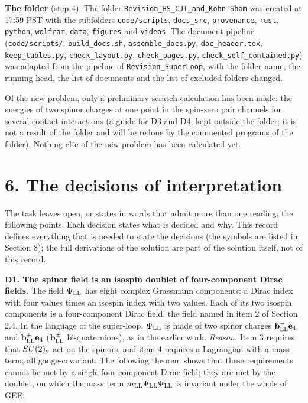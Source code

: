 \documentclass[
  10pt,
]{article}
\begin{document}
\textbf{The folder} (step 4). The folder
\texttt{Revision\_HS\_CJT\_and\_Kohn-Sham} was created at 17:59 PST with
the subfolders \texttt{code/scripts}, \texttt{docs\_src},
\texttt{provenance}, \texttt{rust}, \texttt{python}, \texttt{wolfram},
\texttt{data}, \texttt{figures} and \texttt{videos}. The document
pipeline (\texttt{code/scripts/}: \texttt{build\_docs.sh},
\texttt{assemble\_docs.py}, \texttt{doc\_header.tex},
\texttt{keep\_tables.py}, \texttt{check\_layout.py},
\texttt{check\_pages.py}, \texttt{check\_self\_contained.py}) was
adapted from the pipeline of \texttt{Revision\_SuperLoop}, with the
folder name, the running head, the list of documents and the list of
excluded folders changed.

Of the new problem, only a preliminary scratch calculation has been
made: the energies of two spinor charges at one point in the spin-zero
pair channels for several contact interactions (a guide for D3 and D4,
kept outside the folder; it is not a result of the folder and will be
redone by the commented programs of the folder). Nothing else of the new
problem has been calculated yet.

\hypertarget{the-decisions-of-interpretation}{%
\section{6. The decisions of
interpretation}\label{the-decisions-of-interpretation}}

The task leaves open, or states in words that admit more than one
reading, the following points. Each decision states what is decided and
why. This record defines everything that is needed to state the
decisions (the symbols are listed in Section 8); the full derivations of
the solution are part of the solution itself, not of this record.

\textbf{D1. The spinor field is an isospin doublet of four-component
Dirac fields.} The field \(\Psi_{\rm LL}\) has eight complex Grassmann
components: a Dirac index with four values times an isospin index with
two values. Each of its two isospin components is a four-component Dirac
field, the field named in item 2 of Section 2.4. In the language of the
super-loop, \(\Psi_{\rm LL}\) is made of two spinor charges
\(\mathbf b^-_{\rm LL}\mathbf e_4\) and
\(\mathbf b^+_{\rm LL}\mathbf e_4\) (\(\mathbf b^\pm_{\rm LL}\)
bi-quaternions), as in the earlier work. \emph{Reason.} Item 3 requires
that \(SU(2)_{\rm v}\) act on the spinors, and item 4 requires a
Lagrangian with a mass term, all gauge-covariant. The following theorem
shows that these requirements cannot be met by a single four-component
Dirac field; they are met by the doublet, on which the mass term
\(m_{\rm LL}\bar\Psi_{\rm LL}\Psi_{\rm LL}\) is invariant under the
whole of GEE.
\end{document}
